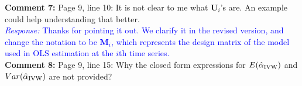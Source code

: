 \documentclass[12pt]{article}
\newcommand{\response}[1]{\noindent \textcolor{blue}{\emph{Response:} #1}}
\begin{document}
{{\bf Comment 7:} Page 9, line 10: It is not clear to me what $\mathbf{U}_i$'s are. An example could help understanding that better. \\


\response{Thanks for pointing it out. We  clarify it in the revised version, and change the notation to be $\mathbf{M}_i$, which represents the design matrix of the model used in OLS estimation at the $i$th time series.} \\ 


{\bf Comment 8:} Page 9, line 15: Why the closed form expressions for $E(\hat{\alpha}_{\rm IVW})$ and $Var(\hat{\alpha}_{\rm IVW})$ are not provided? \\

}
\end{document}
